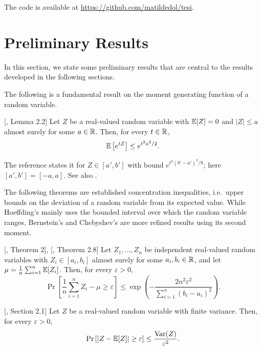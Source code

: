 \documentclass[reqno]{amsart}
\let\oldsection\section
\renewcommand{\section}{\clearpage\thispagestyle{plain}\oldsection}
\begin{document}
The code is available at \href{https://github.com/matildedol/tesi}{https://github.com/matildedol/tesi}.

\newpage
\section{Preliminary Results}\label{sec: prel}

In this section, we state some preliminary results that are central to the results developed in the following sections. 

The following is a fundamental result on the moment generating function of a random variable. 

\begin{theorem}\label{app: hoeffdinglemma} [\cite{boucheron2013concentration}, Lemma 2.2]
  Let $Z$ be a real-valued random variable with $\mathbb{E}[Z]=0$ and $\vert Z\vert\le a$ almost surely for some $a\in\mathbb{R}$. Then, for every $t\in\mathbb{R}$,
  \[
  \mathbb{E}\left[e^{tZ}\right] \le e^{t^2a^2/2}.
  \]
\end{theorem}
The reference states it for $Z\in[a',b']$ with bound $e^{t^2(b'-a')^2/8}$; here $[a',b']=[-a,a]$. See also \cite{hoeffding1963probability}.

The following theorems are established concentration inequalities, i.e.\ upper bounds on the deviation of a random variable from its expected value. While Hoeffding's mainly uses the bounded interval over which the random variable ranges, Bernstein's and Chebyshev's are more refined results using its second moment. 

\begin{theorem}\label{app: hoeffding} [\cite{hoeffding1963probability}, Theorem 2], [\cite{boucheron2013concentration}, Theorem 2.8]
  Let $Z_1,\ldots,Z_n$ be independent real-valued random variables with $Z_i\in[a_i,b_i]$ almost surely for some $a_i,b_i\in\mathbb{R}$, and let $\mu = \frac1n\sum_{i=1}^n \mathbb{E}[Z_i]$. Then, for every $\varepsilon>0$,
  \[
  \Pr\left[\frac1n\sum_{i=1}^n Z_i - \mu \ge \varepsilon\right] \le \exp\left(-\frac{2n^2\varepsilon^2}{\sum_{i=1}^n (b_i-a_i)^2}\right).
  \]
\end{theorem}

\begin{theorem}\label{app: chebyshev} [\cite{boucheron2013concentration}, Section 2.1]
  Let $Z$ be a real-valued random variable with finite variance. Then, for every $\varepsilon>0$,
  \[
  \Pr\left[\vert Z - \mathbb{E}[Z]\vert \ge \varepsilon\right] \le \frac{\operatorname{Var}(Z)}{\varepsilon^2}.
  \]
\end{theorem}
\end{document}
